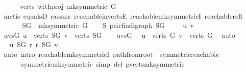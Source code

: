 \begin{isabellebody}
\ \ \ \ \isamarkupfalse%
\ {\isachardoublequoteopen}verts\ {\isacharparenleft}with{\isacharunderscore}proj\ {\isacharparenleft}mk{\isacharunderscore}symmetric\ G{\isacharparenright}{\isacharparenright}\ {\isasymnoteq}\ {\isacharbraceleft}{\isacharbraceright}{\isachardoublequoteclose}\ \isanewline
\ \ \ \ \ \ \isamarkupfalse%
\ {\isacharparenleft}metis\ equals{}D\ r{\isacharunderscore}assms\ reachable{\isacharunderscore}in{\isacharunderscore}vertsE\ reachable{\isacharunderscore}mk{\isacharunderscore}symmetricI\ reachable{\isacharunderscore}refl{\isacharparenright}\isanewline
\ \ \isamarkupfalse%
\isanewline
\ \ \isamarkupfalse%
\ {\isacharquery}SG\ {\isacharequal}\ {\isachardoublequoteopen}mk{\isacharunderscore}symmetric\ G{\isachardoublequoteclose}\isanewline
\ \ \isamarkupfalse%
\ S{\isacharcolon}\ pair{\isacharunderscore}fin{\isacharunderscore}digraph\ {\isachardoublequoteopen}{\isacharquery}SG{\isachardoublequoteclose}\ \isacommand{{\isachardot}{\isachardot}}\isamarkupfalse%
\isanewline
\ \ \isamarkupfalse%
\ u\ v\ \isamarkupfalse%
\ uv{\isacharunderscore}sG{\isacharcolon}\ {\isachardoublequoteopen}u\ {\isasymin}\ verts\ {\isacharquery}SG{\isachardoublequoteclose}\ {\isachardoublequoteopen}v\ {\isasymin}\ verts\ {\isacharquery}SG{\isachardoublequoteclose}\isanewline
\ \ \isamarkupfalse%
\ uv{\isacharunderscore}sG\ \isamarkupfalse%
\ {\isachardoublequoteopen}u\ {\isasymin}\ verts\ G{\isachardoublequoteclose}\ {\isachardoublequoteopen}v\ {\isasymin}\ verts\ G{\isachardoublequoteclose}\ \isamarkupfalse%
\ auto\isanewline
\ \ \isamarkupfalse%
\ \isamarkupfalse%
\ {\isachardoublequoteopen}u\ {\isasymrightarrow}\isactrlsup {\isacharasterisk}\isactrlbsub {\isacharquery}SG\isactrlesub \ r{\isachardoublequoteclose}\ {\isachardoublequoteopen}r\ {\isasymrightarrow}\isactrlsup {\isacharasterisk}\isactrlbsub {\isacharquery}SG\isactrlesub \ v{\isachardoublequoteclose}\ \isanewline
\ \ \ \ \isamarkupfalse%
\ {\isacharparenleft}auto\ intro{\isacharcolon}\ reachable{\isacharunderscore}mk{\isacharunderscore}symmetricI\ path{\isacharunderscore}from{\isacharunderscore}root\ \ symmetric{\isacharunderscore}reachable\isanewline
\ \ \ \ \ \ symmetric{\isacharunderscore}mk{\isacharunderscore}symmetric\ simp\ del{\isacharcolon}\ pverts{\isacharunderscore}mk{\isacharunderscore}symmetric{\isacharparenright}\isanewline
\ \ \isamarkupfalse%

\end{isabellebody}
